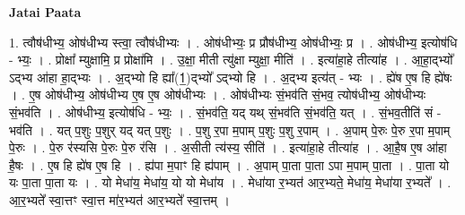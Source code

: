 \documentclass[17pt]{extarticle}
\begin{document}
\textbf{Jatai Paata} \newline

1. त्वौष॑धीभ्य॒ ओष॑धीभ्य स्त्वा॒ त्वौष॑धीभ्यः । . ओष॑धीभ्यः॒ प्र प्रौष॑धीभ्य॒ ओष॑धीभ्यः॒ प्र । . ओष॑धीभ्य॒ इत्योष॑धि - भ्यः॒ । . प्रोक्षा᳚ म्युक्षामि॒ प्र प्रोक्षा॑मि । . उ॒क्षा॒ मीती त्यु॑क्षा म्युक्षा॒ मीति॑ । . इत्या॑हा॒हे तीत्या॑ह । . आ॒हा॒द्भ्यो᳚ ऽद्भ्य आ॑हा हा॒द्भ्यः । . अ॒द्भ्यो हि ह्या᳚(1॒)द्भ्यो᳚ ऽद्भ्यो हि । . अ॒द्भ्य इत्य॑त् - भ्यः । . ह्ये॑ष ए॒ष हि ह्ये॑षः । . ए॒ष ओष॑धीभ्य॒ ओष॑धीभ्य ए॒ष ए॒ष ओष॑धीभ्यः । . ओष॑धीभ्यः सं॒भव॑ति सं॒भव॒ त्योष॑धीभ्य॒ ओष॑धीभ्यः सं॒भव॑ति । . ओष॑धीभ्य॒ इत्योष॑धि - भ्यः॒ । . सं॒भव॑ति॒ यद् यथ् सं॒भव॑ति सं॒भव॑ति॒ यत् । . सं॒भव॒तीति॑ सं - भव॑ति । . यत् प॒शुः प॒शुर् यद् यत् प॒शुः । . प॒शु र॒पा म॒पाम् प॒शुः प॒शु र॒पाम् । . अ॒पाम् पे॒रुः पे॒रु र॒पा म॒पाम् पे॒रुः । . पे॒रु र॑स्यसि पे॒रुः पे॒रु र॑सि । . अ॒सीती त्य॑स्य॒ सीति॑ । . इत्या॑हा॒हे तीत्या॑ह । . आ॒है॒ष ए॒ष आ॑हा है॒षः । . ए॒ष हि ह्ये॑ष ए॒ष हि । . ह्य॑पा म॒पाꣳ हि ह्य॑पाम् । . अ॒पाम् पा॒ता पा॒ता ऽपा म॒पाम् पा॒ता । . पा॒ता यो यः पा॒ता पा॒ता यः । . यो मेधा॑य॒ मेधा॑य॒ यो यो मेधा॑य । . मेधा॑या र॒भ्यत॑ आर॒भ्यते॒ मेधा॑य॒ मेधा॑या र॒भ्यते᳚ । . आ॒र॒भ्यते᳚ स्वा॒त्तꣳ स्वा॒त्त मा॑र॒भ्यत॑ आर॒भ्यते᳚ स्वा॒त्तम् । \newline
\end{document}
